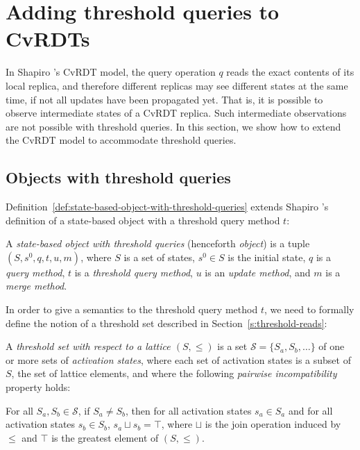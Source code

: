 \section{Adding threshold queries to CvRDTs}\label{s:model}

In Shapiro \etal's CvRDT model,
the query operation $q$ reads the
exact contents of its local replica, and therefore different replicas
may see different states at the same time, if not all updates have
been propagated yet.  That is, it is possible to observe intermediate
states of a CvRDT replica.  Such intermediate observations are not
possible with
threshold queries. In this section, we show how to extend the CvRDT
model to accommodate threshold queries.

\subsection{Objects with threshold queries}

Definition~\ref{def:state-based-object-with-threshold-queries}
extends Shapiro \etal's definition of a state-based object with
a threshold query method $t$:
\begin{definition}
  \label{def:state-based-object-with-threshold-queries}
  A \emph{state-based object with threshold queries} (henceforth
  \emph{object}) is a tuple $(S, s^0, q, t, u, m)$, where $S$ is a set
  of states, $s^0 \in S$ is the initial state, $q$ is a \emph{query
    method}, $t$ is a \emph{threshold query
    method}, $u$ is an \emph{update method}, and $m$ is a \emph{merge
    method}.
\end{definition}

In order to give a semantics to the threshold query method $t$, we
need to formally define the notion of a threshold set described in
Section~\ref{s:threshold-reads}:

\begin{definition}
  \label{def:threshold-set}
  A \emph{threshold set with respect to a lattice $(S, \leq)$} is a
  set $\mathcal{S} = \{ S_a, S_b, \dots \}$ of one or more sets
  of \emph{activation states}, where each set of activation states is a subset of $S$,
  the set of
  lattice elements, and where the following \emph{pairwise
    incompatibility} property holds:

  For all $S_a, S_b \in \mathcal{S}$, if $S_a \neq S_b$, then for all
  activation states $s_a \in S_a$ and for all activation states $s_b \in
  S_b$, $s_a \sqcup s_b = \top$, where $\sqcup$ is the join operation
  induced by $\leq$ and $\top$ is the greatest element of $(S, \leq)$.
\end{definition}

